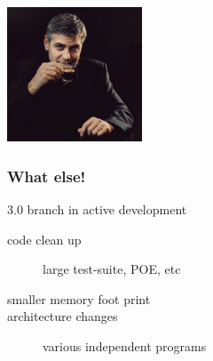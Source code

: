 \begin{frame}
    \begin{center}
    \includegraphics[height=4.0cm]{pics/whatelse.jpg}
    \end{center}
    \frametitle{What else!}

    3.0 branch in active development
    \begin{description}
        \item[code clean up] large test-suite, POE, etc
        \item[smaller memory foot print]
        \item[architecture changes] various independent programs
        \end{description}
\end{frame}


